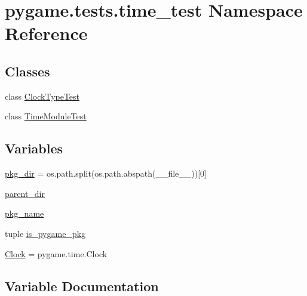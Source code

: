 \hypertarget{namespacepygame_1_1tests_1_1time__test}{}\section{pygame.\+tests.\+time\+\_\+test Namespace Reference}
\label{namespacepygame_1_1tests_1_1time__test}
\subsection*{Classes}
\begin{DoxyCompactItemize}
\item 
class \hyperlink{classpygame_1_1tests_1_1time__test_1_1_clock_type_test}{Clock\+Type\+Test}
\item 
class \hyperlink{classpygame_1_1tests_1_1time__test_1_1_time_module_test}{Time\+Module\+Test}
\end{DoxyCompactItemize}
\subsection*{Variables}
\begin{DoxyCompactItemize}
\item 
\hyperlink{namespacepygame_1_1tests_1_1time__test_a709de30136c0af2af5ed69f0ffe5d776}{pkg\+\_\+dir} = os.\+path.\+split(os.\+path.\+abspath(\+\_\+\+\_\+file\+\_\+\+\_\+))\mbox{[}0\mbox{]}
\item 
\hyperlink{namespacepygame_1_1tests_1_1time__test_aa9aa6eaaf073c5256e9aea08600a3b38}{parent\+\_\+dir}
\item 
\hyperlink{namespacepygame_1_1tests_1_1time__test_af59b38745446db91699e82e70fe3c0b8}{pkg\+\_\+name}
\item 
tuple \hyperlink{namespacepygame_1_1tests_1_1time__test_a1603297900eedd8a25b99f6fe05ad96b}{is\+\_\+pygame\+\_\+pkg}
\item 
\hyperlink{namespacepygame_1_1tests_1_1time__test_af36645654fe5a1ced9d116b769226cfd}{Clock} = pygame.\+time.\+Clock
\end{DoxyCompactItemize}


\subsection{Variable Documentation}
\mbox{\label{namespacepygame_1_1tests_1_1time__test_af36645654fe5a1ced9d116b769226cfd}} 
